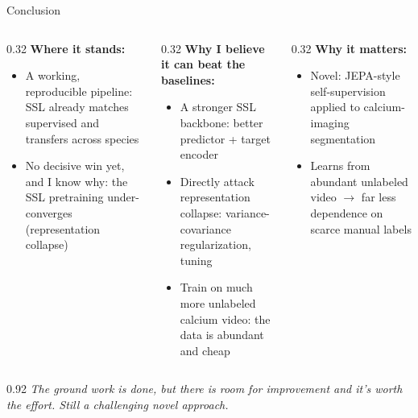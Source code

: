 \begin{frame}[t]{Conclusion}
{\footnotesize
\begin{columns}[t]
\begin{column}{0.32\textwidth}\color{black}
\textbf{Where it stands:}\par\vspace{0.3em}
\begin{itemize}\itemsep=0.2em
\item A working, reproducible pipeline: SSL already matches supervised and
      transfers across species
\item No decisive win yet, and I know why: the SSL pretraining under-converges
      (representation collapse)
\end{itemize}
\end{column}
\hfill%
\begin{column}{0.32\textwidth}\color{black}
\textbf{Why I believe it can beat the baselines:}\par\vspace{0.3em}
\begin{itemize}\itemsep=0.2em
\item A stronger SSL backbone: better predictor + target encoder
\item Directly attack representation collapse: variance-covariance
      regularization, tuning
\item Train on much more unlabeled calcium video: the data is abundant and cheap
\end{itemize}
\end{column}
\hfill%
\begin{column}{0.32\textwidth}\color{black}
\textbf{Why it matters:}\par\vspace{0.3em}
\begin{itemize}\itemsep=0.2em
\item Novel: JEPA-style self-supervision applied to calcium-imaging segmentation
\item Learns from abundant unlabeled video $\to$ far less dependence on scarce
      manual labels
\end{itemize}
\end{column}
\end{columns}}

\vfill
\begin{columns}\begin{column}{0.92\textwidth}\centering
{\color{BaseColor}\itshape The ground work is done, but there is room for
 improvement and it's worth the effort. Still a challenging novel approach.}
\end{column}\end{columns}
\vspace*{0.5em}
\end{frame}
